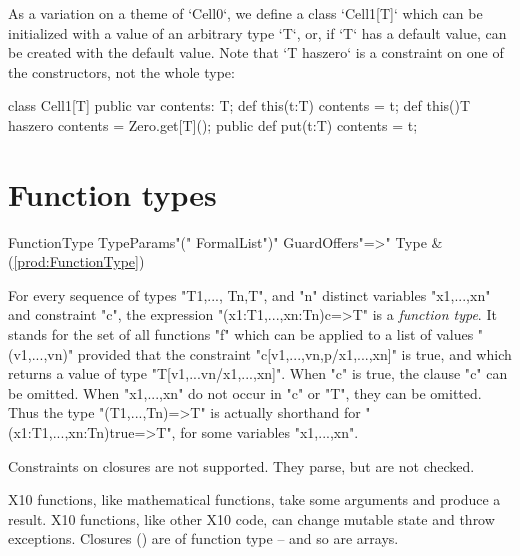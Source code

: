\begin{ex}
As a variation on a theme of \xcd`Cell0`, we define a class \xcd`Cell1[T]` which can be initialized with a value of an arbitrary
type
\xcd`T`, or, if \xcd`T` has a default value, can be created with the default
value.  Note that \xcd`T haszero` is a constraint on one of
the constructors, not the whole type:  
\begin{xten}
class Cell1[T] {
  public var contents: T;
  def this(t:T) { contents = t; }
  def this(){T haszero} { contents = Zero.get[T](); }
  public def put(t:T) {contents = t;}
}
\end{xten}
%

\end{ex}

\section{Function types}
\label{FunctionTypes}
\label{FunctionType}

\begin{bbgrammar}
        FunctionType \: TypeParams\opt \xcd"(" FormalList\opt \xcd")" Guard\opt Offers\opt \xcd"=>" Type & (\ref{prod:FunctionType}) \\
\end{bbgrammar}


For every sequence of types \xcd"T1,..., Tn,T", and \xcd"n" distinct variables
\xcd"x1,...,xn" and constraint \xcd"c", the expression
\xcd"(x1:T1,...,xn:Tn){c}=>T" is a \emph{function type}. It stands for
 the set of all functions \xcd"f" which can be applied to a
 list of values \xcd"(v1,...,vn)" provided that the constraint
 \xcd"c[v1,...,vn,p/x1,...,xn]" is true, and which returns a value of
 type \xcd"T[v1,...vn/x1,...,xn]". When \xcd"c" is true, the clause \xcd"{c}" can be
 omitted. When \xcd"x1,...,xn" do not occur in \xcd"c" or \xcd"T", they can be
 omitted. Thus the type \xcd"(T1,...,Tn)=>T" is actually shorthand for
 \xcd"(x1:T1,...,xn:Tn){true}=>T", for some variables \xcd"x1,...,xn".

\limitationx{}
Constraints on closures are not supported.  They parse, but are not checked.

X10 functions, like mathematical functions, take some arguments and produce a
result.  X10 functions, like other X10 code, can change mutable state and
throw exceptions.  Closures ()  are of function type -- and so
are arrays.


